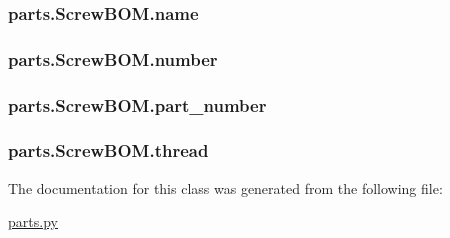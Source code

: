 \subsubsection[{name}]{\setlength{\rightskip}{0pt plus 5cm}parts.\+Screw\+B\+O\+M.\+name}\label{classparts_1_1_screw_b_o_m_a6fdeb65838dbe1de849e62a88a9461a5}
\hypertarget{classparts_1_1_screw_b_o_m_a28bae5532d3be075028dc5a687ac6fe5}{}
\subsubsection[{number}]{\setlength{\rightskip}{0pt plus 5cm}parts.\+Screw\+B\+O\+M.\+number}\label{classparts_1_1_screw_b_o_m_a28bae5532d3be075028dc5a687ac6fe5}
\hypertarget{classparts_1_1_screw_b_o_m_a2de725e42c9c4c5303e30128778ba565}{}
\subsubsection[{part\+\_\+number}]{\setlength{\rightskip}{0pt plus 5cm}parts.\+Screw\+B\+O\+M.\+part\+\_\+number}\label{classparts_1_1_screw_b_o_m_a2de725e42c9c4c5303e30128778ba565}
\hypertarget{classparts_1_1_screw_b_o_m_a7f6d2d536640d638b0391a6b9a1002c7}{}
\subsubsection[{thread}]{\setlength{\rightskip}{0pt plus 5cm}parts.\+Screw\+B\+O\+M.\+thread}\label{classparts_1_1_screw_b_o_m_a7f6d2d536640d638b0391a6b9a1002c7}


The documentation for this class was generated from the following file\+:\begin{DoxyCompactItemize}
\item 
\hyperlink{parts_8py}{parts.\+py}\end{DoxyCompactItemize}
